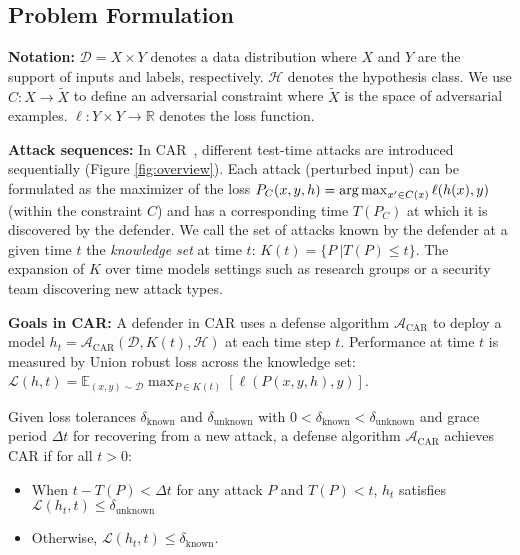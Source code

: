 \subsection{Problem Formulation}
\noindent
\textbf{Notation:} $\mathcal{D} = X \times Y$ denotes a data distribution where $X$ and $Y$ are the support of inputs and labels, respectively.  $\mathcal{H}$ denotes the hypothesis class.  We use $C:X \to \tilde{X}$ to define an adversarial constraint where $\tilde{X}$ is the space of adversarial examples.  $\ell: Y \times Y \to \mathbb{R}$ denotes the loss function.

\noindent
\textbf{Attack sequences:} In CAR~\cite{dai2024position}, different test-time attacks are introduced sequentially (Figure \ref{fig:overview}). Each attack (perturbed input) can be formulated as the maximizer of the loss $P_C(x, y, h) = \operatorname*{arg\,max}_{x' \in C(x)} \ell(h(x), y)$ (within the constraint $C$) and has a corresponding time $T(P_C)$ at which it is discovered by the defender.  We call the set of attacks known by the defender at a given time $t$ the \textit{knowledge set} at time $t$: $K(t) = \{P\ | T(P) \le t\}$. The expansion of $K$ over time models settings such as research groups or a security team discovering new attack types. 

\noindent
\textbf{Goals in CAR:}  A defender in CAR uses a defense algorithm $\mathcal{A}_{\text{CAR}}$ to deploy a model $h_t = \mathcal{A}_{\text{CAR}}(\mathcal{D},K(t),\mathcal{H})$ at each time step $t$. Performance at time $t$ is measured by Union robust loss 
across the knowledge set:
$\mathcal{L}(h, t) = \mathbb{E}_{(x,y)\sim \mathcal{D}} \max_{P \in K(t)} [\ell(P(x,y, h), y)]$.%

\begin{definition} Given loss tolerances $\delta_{\text{known}}$ and $\delta_{\text{unknown}}$ with $0 < \delta_{\text{known}} < \delta_{\text{unknown}}$ and grace period $\Delta t$ for recovering from a new attack, a defense algorithm $\mathcal{A}_{\text{CAR}}$ achieves CAR if for all $t > 0$:
\begin{itemize}
    \item When $t - T(P) < \Delta t$ for any attack $P$ and $T(P) < t$, $h_t$ satisfies $\mathcal{L}(h_t, t) \le \delta_{\text{unknown}}$
    \item Otherwise, $\mathcal{L}(h_t, t) \le \delta_{\text{known}}$.
\end{itemize}
\end{definition}

